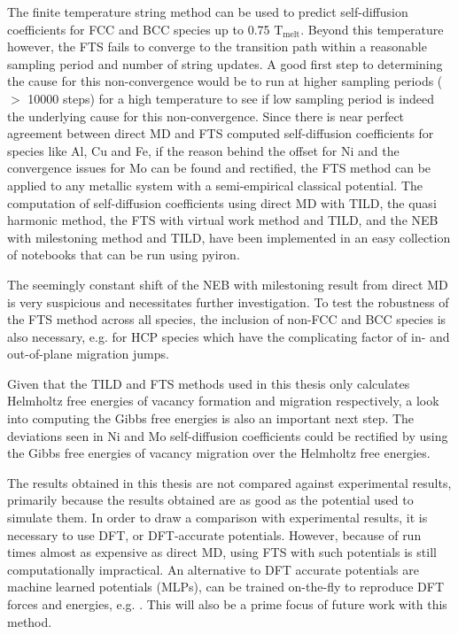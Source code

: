 \documentclass{article}
\begin{document}
The finite temperature string method can be used to predict self-diffusion coefficients for FCC and BCC species up to 0.75 $\mathrm{T_{melt}}$. Beyond this temperature however, the FTS fails to converge to the transition path within a reasonable sampling period and number of string updates. A good first step to determining the cause for this non-convergence would be to run at higher sampling periods ($>$ 10000 steps) for a high temperature to see if low sampling period is indeed the underlying cause for this non-convergence. Since there is near perfect agreement between direct MD and FTS computed self-diffusion coefficients for species like Al, Cu and Fe, if the reason behind the offset for Ni and the convergence issues for Mo can be found and rectified, the FTS method can be applied to any metallic system with a semi-empirical classical potential. The computation of self-diffusion coefficients using direct MD with TILD, the quasi harmonic method, the FTS with virtual work method and TILD, and the NEB with milestoning method and TILD, have been implemented in an easy collection of notebooks that can be run using pyiron. 

The seemingly constant shift of the NEB with milestoning result from direct MD is very suspicious and necessitates further investigation. To test the robustness of the FTS method across all species, the inclusion of non-FCC and BCC species is also necessary, e.g. for HCP species which have the complicating factor of in- and out-of-plane migration jumps.

Given that the TILD and FTS methods used in this thesis only calculates Helmholtz free energies of vacancy formation and migration respectively, a look into computing the Gibbs free energies is also an important next step. The deviations seen in Ni and Mo self-diffusion coefficients could be rectified by using the Gibbs free energies of vacancy migration over the Helmholtz free energies.

The results obtained in this thesis are not compared against experimental results, primarily because the results obtained are as good as the potential used to simulate them. In order to draw a comparison with experimental results, it is necessary to use DFT, or DFT-accurate potentials. However, because of run times almost as expensive as direct MD, using FTS with such potentials is still computationally impractical. An alternative to DFT accurate potentials are machine learned potentials (MLPs), can be trained on-the-fly to reproduce DFT forces and energies, e.g. \cite{Gubaev2018}. This will also be a prime focus of future work with this method.
\end{document}
